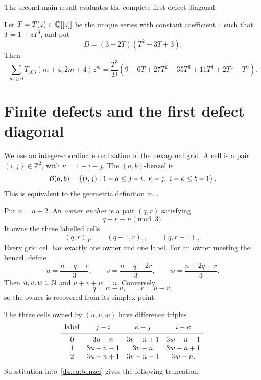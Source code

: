 
The second main result evaluates the complete first-defect diagonal.

\begin{samepage}
\begin{theorem}\label{d4:thm:main}
Let $T=T(z)\in\mathbb Q[[z]]$ be the unique series with constant coefficient $1$
such that $T=1+zT^3$, and put
\[
 D=(3-2T)(T^2-3T+3).
\]
Then
\begin{equation}\label{d4:eq:main-formula}
 \sum_{m\ge0}T_{103}(m+4,2m+4)z^m
 =\frac{T^3}{D}
   (9-6T+27T^2-35T^3+11T^4+2T^5-T^6).
\end{equation}
\end{theorem}
\end{samepage}

\section{Finite defects and the first defect diagonal}

We use an integer-coordinate realization of the hexagonal grid.  A cell is a
pair $(i,j)\in\mathbb Z^2$, with $\kappa=1-i-j$.  The $(a,b)$-benzel is
\begin{equation}\label{d4:eq:benzel}
 \mathcal B(a,b)=\left\{(i,j):
 1-a\le j-i,\ \kappa-j,\ i-\kappa\le b-1\right\}.
\end{equation}
This is equivalent to the geometric definition in~\cite{DLPY}.

Put $n=a-2$.  An \emph{owner anchor} is a pair $(q,r)$ satisfying
\[
 q-r\equiv n\pmod 3.
\]
It owns the three labelled cells
\[
 (q,r)_0,\qquad(q+1,r)_1,\qquad(q,r+1)_2.
\]
Every grid cell has exactly one owner and one label.  For an owner meeting the
benzel, define
\begin{equation}\label{d4:eq:uvw}
 u=\frac{n-q+r}{3},\qquad
 v=\frac{n-q-2r}{3},\qquad
 w=\frac{n+2q+r}{3}.
\end{equation}
Then $u,v,w\in\mathbb N$ and $u+v+w=n$.  Conversely,
\[
 q=w-u,\qquad r=u-v,
\]
so the owner is recovered from its simplex point.

The three cells owned by $(u,v,w)$ have difference triples
\begin{equation}\label{d4:eq:difference-table}
\begin{array}{c|ccc}
\text{label}&j-i&\kappa-j&i-\kappa\\ \midrule
0&3u-n&3v-n+1&3w-n-1\\
1&3u-n-1&3v-n&3w-n+1\\
2&3u-n+1&3v-n-1&3w-n.
\end{array}
\end{equation}
Substitution into~\eqref{d4:eq:benzel} gives the following truncation.

